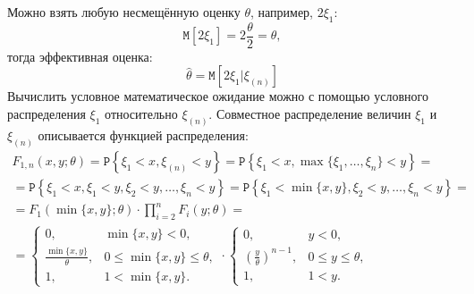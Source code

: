 \documentclass[a4paper,12pt]{article}
\newcommand{\expectation}[1]{\texttt{M} \left[ #1 \right]}
\newcommand{\cexpectation}[2]{\texttt{M} \left[ #1 | #2 \right]}
\newcommand{\probability}[1]{\texttt{P} \left \{ #1 \right\} }
\begin{document}
\begin{enumerate}
\begin{enumerate}
                    Можно взять любую несмещённую оценку $\theta$, например, $2 \xi_1$:
                    \[
                        \expectation{2 \xi_1} = 2 \frac{\theta}{2} = \theta,
                    \]
                    тогда эффективная оценка:
                    \[
                        \widehat{\theta} = \cexpectation{2 \xi_1}{\xi_{(n)}}
                    \]
                    Вычислить условное математическое ожидание можно с помощью условного распределения $\xi_1$ относительно $\xi_{(n)}$.
                    Совместное распределение величин $\xi_1$ и $\xi_{(n)}$ описывается функцией распределения:
                    \begin{multline*}
                        F_{1,n}(x,y; \theta)
                        = \probability{\xi_1 < x, \xi_{(n)} < y}
                        = \probability{\xi_1 < x, \max \{ \xi_1, \dots, \xi_n \} < y} = \\
                        = \probability{\xi_1 < x, \xi_1 < y, \xi_2 < y, \dots, \xi_n < y}
                        = \probability{\xi_1 < \min \{ x, y \}, \xi_2 < y, \dots, \xi_n < y} = \\
                        = F_1(\min \{ x, y \}; \theta) \cdot \prod_{i=2}^n F_i(y; \theta) = \\
                        = \left \{
                        \begin{array}{ll}
                            0,                              & \min \{ x, y \} < 0,              \\
                            \frac{\min \{ x, y \}}{\theta}, & 0 \le \min \{ x, y \} \le \theta, \\
                            1,                              & 1 < \min \{ x, y \} .
                        \end{array}
                        \right .
                        \cdot
                        \left \{
                        \begin{array}{ll}
                            0,                                     & y < 0,              \\
                            \left( \frac{y}{\theta} \right)^{n-1}, & 0 \le y \le \theta, \\
                            1,                                     & 1 < y .
                        \end{array}
                        \right .
                    \end{multline*}

\end{enumerate}
\end{enumerate}
\end{document}
